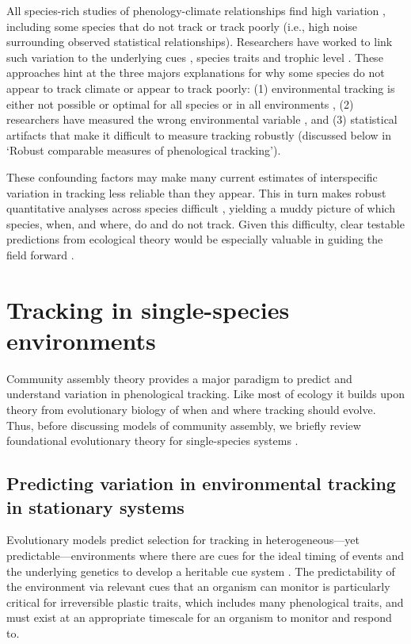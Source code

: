 \documentclass[11pt,letterpaper]{article}
\begin{document}
All species-rich studies of phenology-climate relationships find high variation \citep{Cook:2012pnas,thackeray2016}, including some species that do not track or track poorly (i.e., high noise surrounding observed statistical relationships). Researchers have worked to link such variation to the underlying cues \citep[e.g.,][]{Cook:2012pnas}, species traits \citep[e.g.,][]{cohen2018} and trophic level \citep[e.g.,][]{thackeray2016}. These approaches hint at the three majors explanations for why some species do not appear to track climate or appear to track poorly: (1) environmental tracking is either not possible or optimal for all species or in all environments \citep[discussed below in `Tracking in single-species environments' and see][]{simons2011}, (2) researchers have measured the wrong environmental variable \citep[i.e., a variable species do not track,][]{chmura2019}, and (3) statistical artifacts that make it difficult to measure tracking robustly (discussed below in `Robust comparable measures of phenological tracking'). 

These confounding factors may make many current estimates of interspecific variation in tracking less reliable than they appear. This in turn makes robust quantitative analyses across species difficult \citep{brown2016,kharouba2018}, yielding a muddy picture of which species, when, and where, do and do not track. Given this difficulty, clear testable predictions from ecological theory would be especially valuable in guiding the field forward \citep{Smaldino2016}.  

\section{Tracking in single-species environments}
Community assembly theory provides a major paradigm to predict and understand variation in phenological tracking. Like most of ecology it builds upon theory from evolutionary biology of when and where tracking should evolve. Thus, before discussing models of community assembly, we briefly review foundational evolutionary theory for single-species systems \citep[where most work has focused, but see][]{Mathias2002,Childs2010,Johansson2015}.

\subsection{Predicting variation in environmental tracking in stationary systems} 
Evolutionary models predict selection for tracking in heterogeneous---yet predictable---environments where there are cues for the ideal timing of events \citep{Piersma:2003wj,reed2010} and the underlying genetics to develop a heritable cue system \citep[tracking is likely strongly heritable, given that many cue systems are themselves heritable, e.g.,][]{vanAsch2007gcb,Wilczek:2010ad}. The predictability of the environment via relevant cues that an organism can monitor is particularly critical for irreversible plastic traits, which includes many phenological traits, and must exist at an appropriate timescale for an organism to monitor and respond to. 
\end{document}

